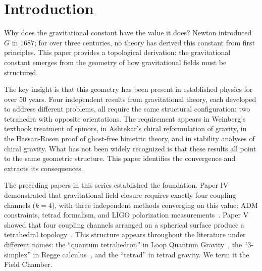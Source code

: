 \documentclass[aps,prd,preprint,superscriptaddress,showpacs,preprintnumbers,amsmath,amssymb,nofootinbib]{revtex4-2}
\begin{document}


\maketitle

\section{Introduction}
\label{sec:intro}

Why does the gravitational constant have the value it does? Newton introduced $G$ in 1687; for over three centuries, no theory has derived this constant from first principles. This paper provides a topological derivation: the gravitational constant emerges from the geometry of how gravitational fields must be structured.

The key insight is that this geometry has been present in established physics for over 50 years. Four independent results from gravitational theory, each developed to address different problems, all require the same structural configuration: two tetrahedra with opposite orientations. The requirement appears in Weinberg's textbook treatment of spinors, in Ashtekar's chiral reformulation of gravity, in the Hassan-Rosen proof of ghost-free bimetric theory, and in stability analyses of chiral gravity. What has not been widely recognized is that these results all point to the same geometric structure. This paper identifies the convergence and extracts its consequences.

The preceding papers in this series established the foundation. Paper IV demonstrated that gravitational field closure requires exactly four coupling channels ($k=4$), with three independent methods converging on this value: ADM constraints, tetrad formalism, and LIGO polarization measurements~\cite{paper4}. Paper V showed that four coupling channels arranged on a spherical surface produce a tetrahedral topology~\cite{paper5}. This structure appears throughout the literature under different names: the ``quantum tetrahedron'' in Loop Quantum Gravity~\cite{rovelli2014}, the ``3-simplex'' in Regge calculus~\cite{regge1961}, and the ``tetrad'' in tetrad gravity. We term it the Field Chamber.
\end{document}
